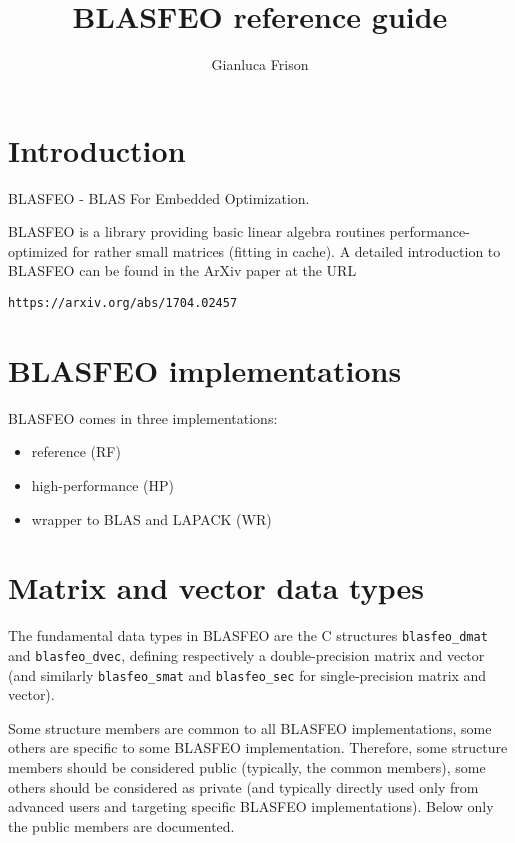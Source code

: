 \documentclass[a4paper]{report}
\title{BLASFEO reference guide}
\author{Gianluca Frison}
\begin{document}
\maketitle
\tableofcontents





\chapter{Introduction}

BLASFEO - BLAS For Embedded Optimization.

BLASFEO is a library providing basic linear algebra routines performance-optimized for rather small matrices (fitting in cache).
A detailed introduction to BLASFEO can be found in the ArXiv paper at the URL
\begin{verbatim}
https://arxiv.org/abs/1704.02457
\end{verbatim}





\chapter{BLASFEO implementations}

BLASFEO comes in three implementations:
\begin{itemize}
\item reference (RF)
\item high-performance (HP)
\item wrapper to BLAS and LAPACK (WR)
\end{itemize}




\chapter{Matrix and vector data types}

The fundamental data types in BLASFEO are the C structures {\tt blasfeo\_dmat} and {\tt blasfeo\_dvec}, defining respectively a double-precision matrix and vector (and similarly {\tt blasfeo\_smat} and {\tt blasfeo\_sec} for single-precision matrix and vector).

Some structure members are common to all BLASFEO implementations, some others are specific to some BLASFEO implementation.
Therefore, some structure members should be considered public (typically, the common members), some others should be considered as private (and typically directly used only from advanced users and targeting specific BLASFEO implementations).
Below only the public members are documented.
\end{document}
